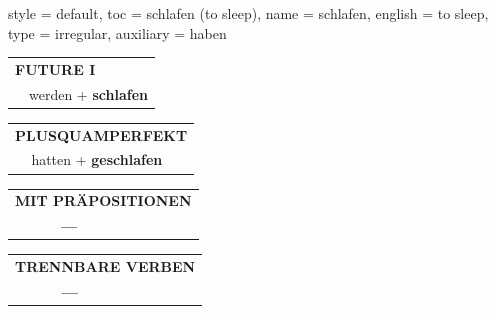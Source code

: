 \begin{verbentry}{
  style = {default},
  toc = {schlafen (to sleep)},
  name = {schlafen},
  english = {to sleep},
  type = {irregular},
  auxiliary = {haben}
}
\begin{tabular}{rl}
    \multicolumn{2}{l}{\textbf{FUTURE I} }\\
  &  werden + \textbf{schlafen}\\
 
  \end{tabular}
\hfill
   \begin{tabular}{rl}
      \multicolumn{2}{l}{\textbf{PLUSQUAMPERFEKT}}\\
  &  hatten + \textbf{geschlafen}\\
  \end{tabular}
  
  \vspace{10pt}



\begin{tabular}{lll}
\multicolumn{3}{l}{\textbf{MIT PRÄPOSITIONEN}}\\
& \textbf{---} & \\
\end{tabular}
\hfill
\begin{tabular}{lll}
\multicolumn{3}{l}{\textbf{TRENNBARE VERBEN}}\\
& \textbf{---} & \\
\end{tabular}

  \vspace{-5pt}
\end{verbentry}

